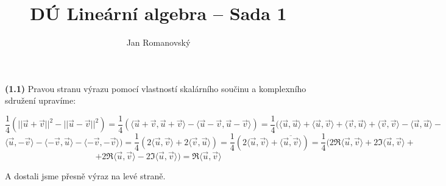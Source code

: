 \documentclass{article}
\title{DÚ Lineární algebra -- Sada 1}
\author{Jan Romanovský}
\begin{document}
\maketitle

\textbf{(1.1)} Pravou stranu výrazu pomocí vlastností skalárního součinu a komplexního sdružení upravíme:

$$\frac{1}{4}(||\vec{u}+\vec{v}||^2-||\vec{u}-\vec v||^2) = \frac{1}{4}(\langle\vec{u}+\vec{v}, \vec{u}+\vec{v}\rangle-\langle \vec{u}-\vec{v}, \vec{u}-\vec{v}\rangle)= \frac{1}{4}(\langle \vec{u}, \vec{u} \rangle+\langle \vec{u}, \vec{v} \rangle+ \langle \vec{v}, \vec{u} \rangle+\langle \vec{v}, \vec{v} \rangle - \langle \vec{u}, \vec{u} \rangle -$$
$$ \langle \vec{u}, -\vec{v} \rangle-\langle -\vec{v}, \vec{u} \rangle-\langle -\vec{v}, -\vec{v} \rangle)= \frac{1}{4}(2\langle \vec{u}, \vec{v}\rangle+2\langle \vec{v}, \vec{u} \rangle ) = \frac{1}{4}(2\langle \vec{u}, \vec{v} \rangle+\overline{\langle \vec{u}, \vec{v} \rangle})=\frac{1}{4}(2\Re \langle \vec{u}, \vec{v} \rangle+2 \Im \langle \vec{u}, \vec{v} \rangle+$$
$$+2 \Re \langle \vec{u}, \vec{v} \rangle -2\Im \langle \vec{u}, \vec{v} \rangle)= \Re \langle \vec{u}, \vec{v} \rangle$$

A dostali jsme přesně výraz na levé straně.
\end{document}

